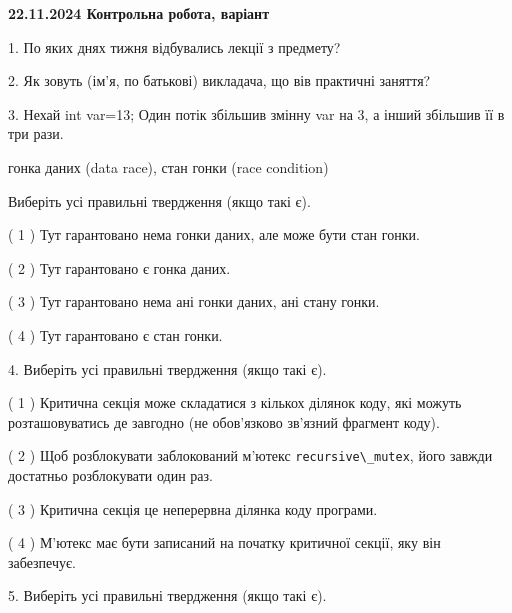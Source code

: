 \documentclass[12pt, ukrainian]{article}
\def\code#1{\Verb!#1!}
\begin{document}
\vspace{4mm}
\newpage
\begin {large}

\textbf{22.11.2024 Контрольна робота, варіант  }\par


{
1. По яких днях тижня відбувались лекції з предмету?



\vspace{5mm}
2. Як зовуть (ім'я, по батькові) викладача, що вів практичні заняття?



\vspace{5mm}
3. Нехай int var=13; Один потік збільшив змінну var на 3, а інший збільшив її в три рази.

гонка даних (data race), стан гонки (race condition)

Виберіть усі правильні твердження (якщо такі є).\par
\vspace{2mm}
( 1 ) Тут гарантовано нема гонки даних, але може бути стан гонки.%

( 2 ) Тут гарантовано є гонка даних.%

( 3 ) Тут гарантовано нема ані гонки даних, ані стану гонки.%

( 4 ) Тут гарантовано є стан гонки.%


\vspace{5mm}
4. Виберіть усі правильні твердження (якщо такі є).\par
\vspace{2mm}

( 1 ) Критична секція може складатися з кількох ділянок коду, які можуть розташовуватись де завгодно (не обов’язково зв’язний фрагмент коду).%

( 2 ) Щоб розблокувати заблокований м’ютекс \code{recursive\_mutex}, його завжди достатньо розблокувати один раз.%

( 3 ) Критична секція це неперервна ділянка коду програми.%

( 4 ) М’ютекс має бути записаний на початку критичної секції, яку він забезпечує.%


\vspace{5mm}
5. Виберіть усі правильні твердження (якщо такі є).\par
\vspace{2mm}

}
\end{large}
\end{document}
